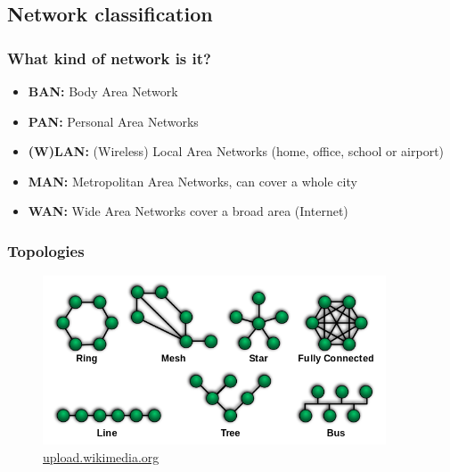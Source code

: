 \subsection{Network classification}
  \begin{frame}
    \frametitle{What kind of network is it?}
      \begin{itemize}
        \item \textbf{BAN:} Body Area Network\pause
        \item \textbf{PAN:} Personal Area Networks\pause
        \item \textbf{(W)LAN:} (Wireless) Local Area Networks (home, office, school or airport)\pause
        \item \textbf{MAN:} Metropolitan Area Networks, can cover a whole city\pause
        \item \textbf{WAN:} Wide Area Networks cover a broad area (Internet)
      \end{itemize}
  \end{frame}
  \begin{frame}
    \frametitle{Topologies}
    \begin{figure}[t]
      \centering
      \includegraphics[height=5cm]{./imgs/topologies.png}
      \caption{\color{blue}\href{https://upload.wikimedia.org/wikipedia/commons/thumb/9/97/NetworkTopologies.svg/640px-NetworkTopologies.svg.png}{upload.wikimedia.org}}
      \label{fig:topologies}
    \end{figure}
  \end{frame}
